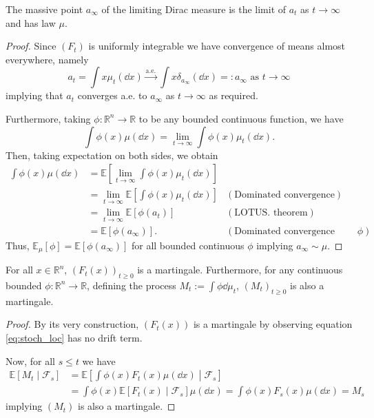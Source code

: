 \begin{corollary}\label{cor:lim_dis}
  The massive point \(a_\infty\) of the limiting Dirac measure is the limit of \(a_t\) as 
  \(t \to \infty\) and has law \(\mu\).
\end{corollary}
\begin{proof}
  Since \((F_t)\) is uniformly integrable we have convergence of means almost everywhere, namely
  \[a_t = \int x \mu_t(\dd x) \xrightarrow{\text{a.e.}} \int x \delta_{a_\infty}(\dd x) =: a_\infty \text{ as } t \to \infty\]
  implying that \(a_t\) converges a.e. to \(a_\infty\) as \(t \to \infty\) as required. 
  
  Furthermore, taking \(\phi : \mathbb{R}^n \to \mathbb{R}\) to be any bounded continuous function, we have
  \[\int \phi(x) \mu(\dd x) = \lim_{t \to \infty} \int \phi(x) \mu_t(\dd x).\]
  Then, taking expectation on both sides, we obtain
  \begin{align*}
    \int \phi(x) \mu(\dd x) & = \mathbb{E}\left[\lim_{t \to \infty} \int \phi(x) \mu_t(\dd x)\right] & \\
    & = \lim_{t \to \infty} \mathbb{E}\left[\int \phi(x) \mu_t(\dd x)\right] & (\text{Dominated convergence})\\
    & = \lim_{t \to \infty} \mathbb{E}[\phi(a_t)] & (\text{LOTUS. theorem})\\
    & = \mathbb{E}[\phi(a_\infty)]. & (\text{Dominated convergence \& continuity of } \phi)
  \end{align*}
  Thus, \(\mathbb{E}_\mu[\phi] = \mathbb{E}[\phi(a_\infty)]\) for all bounded continuous \(\phi\) implying 
  \(a_\infty \sim \mu\).
\end{proof}

\begin{proposition}
  For all \(x \in \mathbb{R}^n\), \((F_t(x))_{t \ge 0}\) is a martingale. Furthermore, for any 
  continuous bounded \(\phi : \mathbb{R}^n \to \mathbb{R}\), defining the process 
  \(M_t := \int \phi \dd \mu_t\), \((M_t)_{t \ge 0}\) is also a martingale.
\end{proposition}
\begin{proof}
  By its very construction, \((F_t(x))\) is a martingale by observing equation \ref{eq:stoch_loc} has no 
  drift term.
  
  Now, for all \(s \le t\) we have
  \begin{align*}
    \mathbb{E}[M_t \mid \mathscr{F}_s] 
    & = \mathbb{E}\left[\int \phi(x) F_t(x) \mu(\dd x) \middle\vert \mathscr{F}_s\right]\\
    & = \int \phi(x) \mathbb{E}[F_t(x) \mid \mathscr{F}_s] \mu(\dd x) 
    = \int \phi(x) F_s(x) \mu(\dd x)
    = M_s
  \end{align*}
  implying \((M_t)\) is also a martingale.
\end{proof}

